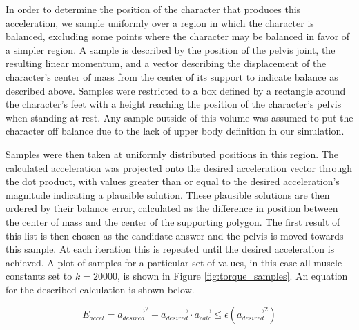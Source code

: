 In order to determine the position of the character that produces this acceleration, we sample uniformly over a region in which the character is balanced, excluding some points where the character may be balanced in favor of a simpler region.   A sample is described by the position of the pelvis joint, the resulting linear momentum, and a vector describing the displacement of the character's center of mass from the center of its support to indicate balance as described above.  Samples were restricted to a box defined by a rectangle around the character's feet with a height reaching the position of the character's pelvis when standing at rest.  Any sample outside of this volume was assumed to put the character off balance due to the lack of upper body definition in our simulation.

Samples were then taken at uniformly distributed positions in this region.  The calculated acceleration was projected onto the desired acceleration vector through the dot product, with values greater than or equal to the desired acceleration's magnitude indicating a plausible solution.  These plausible solutions are then ordered by their balance error, calculated as the difference in position between the center of mass and the center of the supporting polygon.  The first result of this list is then chosen as the candidate answer and the pelvis is moved towards this sample.  At each iteration this is repeated until the desired acceleration is achieved.  A plot of samples for a particular set of values, in this case all muscle constants set to $k=20000$, is shown in Figure \ref{fig:torque_samples}.  An equation for the described calculation is shown below.

\[
	E_{accel} = \vec{a_{desired}}^2 - \vec{a_{desired}} \cdot \vec{a_{calc}} \le \epsilon \left(\vec{a_{desired}}^2\right)
\]

